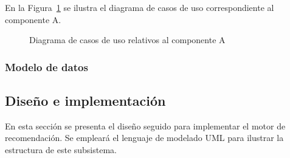 En la Figura~\ref{f:dev:use-cases-recsys} se ilustra el diagrama de casos de uso correspondiente al componente A.

\begin{figure}[h!]
\centering
\caption{Diagrama de casos de uso relativos al componente A}
\label{f:dev:use-cases-recsys}
\end{figure}

\subsubsection{Modelo de datos}


\subsection{Diseño e implementación}
En esta sección se presenta el diseño seguido para implementar el motor de recomendación. Se empleará el lenguaje de modelado UML para ilustrar la estructura de este subsistema.

